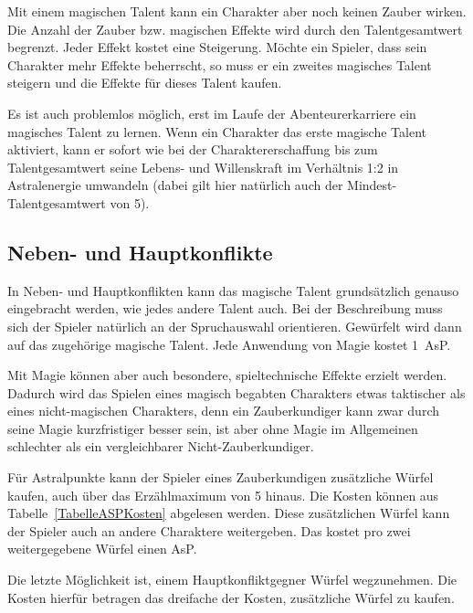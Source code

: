 Mit einem magischen Talent kann ein Charakter aber noch keinen Zauber wirken. Die Anzahl der Zauber bzw. magischen Effekte wird durch den Talentgesamtwert begrenzt. Jeder Effekt kostet eine Steigerung. Möchte ein Spieler, dass sein Charakter mehr Effekte beherrscht, so muss er ein zweites magisches Talent steigern und die Effekte für dieses Talent kaufen.

Es ist auch problemlos möglich, erst im Laufe der Abenteurerkarriere ein magisches Talent zu lernen. Wenn ein Charakter das erste magische Talent aktiviert, kann er sofort wie bei der Charaktererschaffung bis zum Talentgesamtwert seine Lebens- und Willenskraft im Verhältnis 1:2 in Astralenergie umwandeln (dabei gilt hier natürlich auch der Mindest-Talentgesamtwert von 5).


\subsection{Neben- und Hauptkonflikte}
In Neben- und Hauptkonflikten kann das magische Talent grundsätzlich genauso eingebracht werden, wie jedes andere Talent auch. Bei der Beschreibung muss sich der Spieler natürlich an der Spruchauswahl orientieren. Gewürfelt wird dann auf das zugehörige magische Talent. Jede Anwendung von Magie kostet 1~AsP.

Mit Magie können aber auch besondere, spieltechnische Effekte erzielt werden. Dadurch wird das Spielen eines magisch begabten Charakters etwas taktischer als eines nicht-magischen Charakters, denn ein Zauberkundiger kann zwar durch seine Magie kurzfristiger besser sein, ist aber ohne Magie im Allgemeinen schlechter als ein vergleichbarer Nicht-Zauberkundiger.

Für Astralpunkte kann der Spieler eines Zauberkundigen zusätzliche Würfel kaufen, auch über das Erzählmaximum von 5 hinaus. Die Kosten können aus Tabelle~\ref{TabelleASPKosten} abgelesen werden. Diese zusätzlichen Würfel kann der Spieler auch an andere Charaktere weitergeben. Das kostet pro zwei weitergegebene Würfel einen AsP.

Die letzte Möglichkeit ist, einem Hauptkonfliktgegner Würfel wegzunehmen. Die Kosten hierfür betragen das dreifache der Kosten, zusätzliche Würfel zu kaufen.

